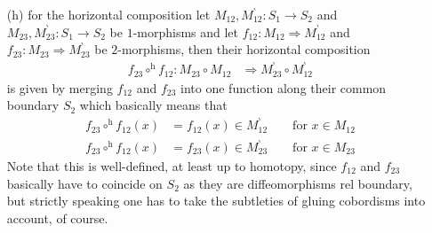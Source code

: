 \begin{enumerate}
\begin{enumerate}
\begin{enumerate}
\item[(h)]
for the horizontal composition let $M_{12},M_{12}^{\backprime} \colon S_{1} \to S_{2}$ and $M_{23},M_{23}^{\backprime} \colon S_{1} \to S_{2}$ be $1$-morphisms and let $f_{12} \colon M_{12} \Rightarrow M_{12}^{\backprime}$ and $f_{23} \colon M_{23} \Rightarrow M_{23}^{\backprime}$ be $2$-morphisms, then their horizontal composition
\begin{align*}
  f_{23}
  \circ^{\mathrm{h}}
  f_{12}
  \colon
  M_{23}
  \circ
  M_{12}
  &\Rightarrow
  M_{23}^{\backprime}
  \circ
  M_{12}^{\backprime}
\end{align*}
is given by {\glqq}merging{\grqq} $f_{12}$ and $f_{23}$ into one function along their common {\glqq}boundary{\grqq} $S_{2}$ which basically means that
\begin{align*}
  f_{23}
  \circ^{\mathrm{h}}
  f_{12}
  (x)
  &=
  f_{12}(x)
  \in
  M_{12}^{\backprime}
  \qquad
  \text{for }
  x
  \in
  M_{12}
  \\
  f_{23}
  \circ^{\mathrm{h}}
  f_{12}
  (x)
  &=
  f_{23}(x)
  \in
  M_{23}^{\backprime}
  \qquad
  \text{for }
  x
  \in
  M_{23}
\end{align*}
Note that this is well-defined, at least up to homotopy, since $f_{12}$ and $f_{23}$ basically have to coincide on $S_{2}$ as they are diffeomorphisms rel boundary, but strictly speaking one has to take the subtleties of gluing cobordisms into account, of course.
\end{enumerate}


\end{enumerate}
\end{enumerate}

